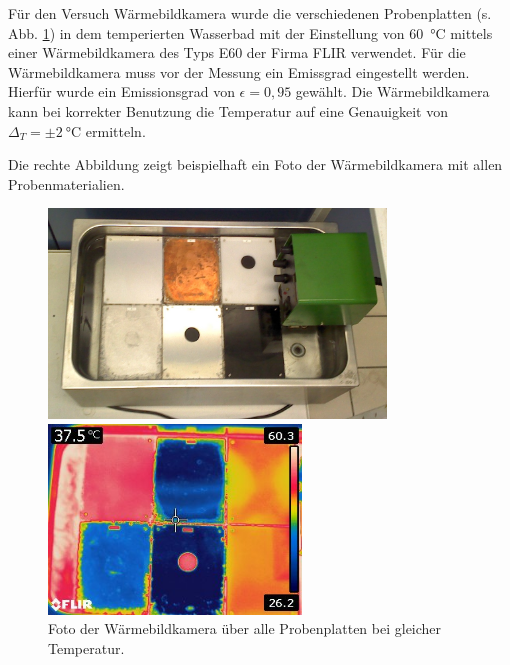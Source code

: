 Für den Versuch Wärmebildkamera wurde die verschiedenen Probenplatten (s. Abb. \ref{fig:VersuchsaufbauWBK}) in dem temperierten Wasserbad mit der Einstellung von \SI{60}{\celsius} mittels einer Wärmebildkamera des Typs E60 der Firma FLIR verwendet. Für die Wärmebildkamera muss vor der Messung ein Emissgrad eingestellt werden. Hierfür wurde ein Emissionsgrad von $\epsilon=0,95$ gewählt. Die Wärmebildkamera kann bei korrekter Benutzung die Temperatur auf eine Genauigkeit von $\Delta_T = \pm \SI{2}{\celsius}$ ermitteln.

Die rechte Abbildung zeigt beispielhaft ein Foto der Wärmebildkamera mit allen Probenmaterialien. 

\begin{figure}[H]
	\begin{minipage}{0.5\textwidth}
		\centering
		\includegraphics[width=0.8\textwidth]{../FLIR_100/FLIR2240.jpg}
		\caption[Versuchsaufbau Wärmebildkamera]{Versuchsaufbau Wärmebildkamera: Die unterschiedlichen Probenplatten wurden im selben Wärmebad mit \SI{60,0}{\celsius} temperiert.}
		\label{fig:VersuchsaufbauWBK}
	\end{minipage}\hfill
	\begin{minipage}{0.5\textwidth}
		\centering
		\includegraphics[width=0.6\textwidth]{../FLIR_100/FLIR2241.jpg}
		\caption[Foto der Wärmebildkamera über alle Probenplatten]{Foto der Wärmebildkamera über alle Probenplatten bei gleicher Temperatur.}
		\label{fig:VersuchsaufbauWBK}
	\end{minipage}
\end{figure}

